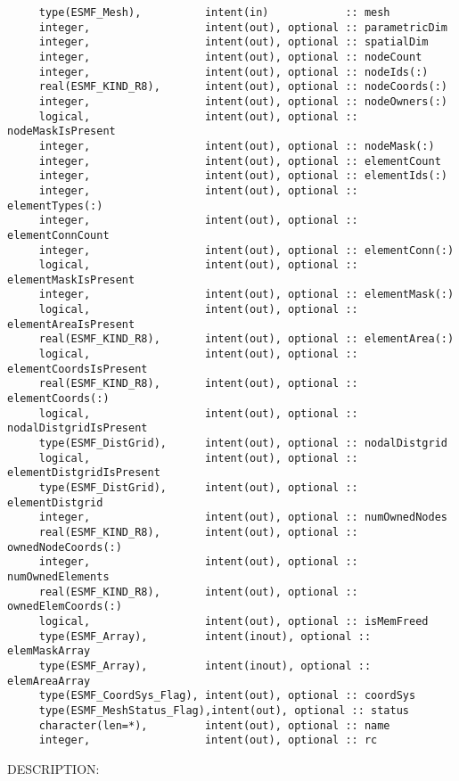 \begin{verbatim}     type(ESMF_Mesh),          intent(in)            :: mesh
     integer,                  intent(out), optional :: parametricDim
     integer,                  intent(out), optional :: spatialDim
     integer,                  intent(out), optional :: nodeCount
     integer,                  intent(out), optional :: nodeIds(:)
     real(ESMF_KIND_R8),       intent(out), optional :: nodeCoords(:)
     integer,                  intent(out), optional :: nodeOwners(:)
     logical,                  intent(out), optional :: nodeMaskIsPresent
     integer,                  intent(out), optional :: nodeMask(:)
     integer,                  intent(out), optional :: elementCount
     integer,                  intent(out), optional :: elementIds(:)
     integer,                  intent(out), optional :: elementTypes(:)
     integer,                  intent(out), optional :: elementConnCount
     integer,                  intent(out), optional :: elementConn(:)
     logical,                  intent(out), optional :: elementMaskIsPresent
     integer,                  intent(out), optional :: elementMask(:)
     logical,                  intent(out), optional :: elementAreaIsPresent
     real(ESMF_KIND_R8),       intent(out), optional :: elementArea(:)
     logical,                  intent(out), optional :: elementCoordsIsPresent
     real(ESMF_KIND_R8),       intent(out), optional :: elementCoords(:)
     logical,                  intent(out), optional :: nodalDistgridIsPresent
     type(ESMF_DistGrid),      intent(out), optional :: nodalDistgrid
     logical,                  intent(out), optional :: elementDistgridIsPresent
     type(ESMF_DistGrid),      intent(out), optional :: elementDistgrid
     integer,                  intent(out), optional :: numOwnedNodes
     real(ESMF_KIND_R8),       intent(out), optional :: ownedNodeCoords(:)
     integer,                  intent(out), optional :: numOwnedElements
     real(ESMF_KIND_R8),       intent(out), optional :: ownedElemCoords(:)
     logical,                  intent(out), optional :: isMemFreed
     type(ESMF_Array),         intent(inout), optional :: elemMaskArray
     type(ESMF_Array),         intent(inout), optional :: elemAreaArray
     type(ESMF_CoordSys_Flag), intent(out), optional :: coordSys
     type(ESMF_MeshStatus_Flag),intent(out), optional :: status
     character(len=*),         intent(out), optional :: name
     integer,                  intent(out), optional :: rc\end{verbatim}
{\sf DESCRIPTION:\\ }


